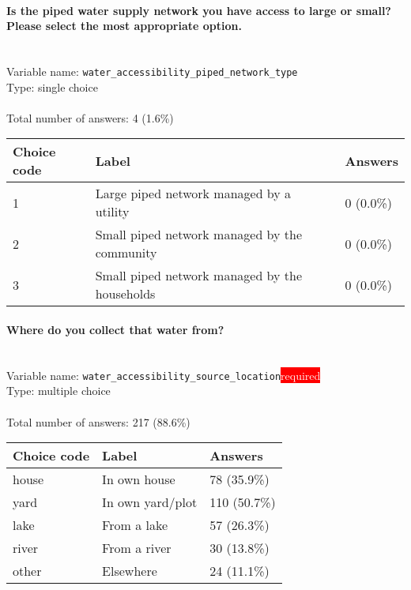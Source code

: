 \documentclass[11.5pt, a4paper]{scrartcl}
\begin{document}
\paragraph{Is the piped water supply network you have access to large or small? Please select the most appropriate option.}
\  \\Variable name: \texttt{water\_accessibility\_piped\_network\_type}\\
Type: single choice\\
\\Total number of answers: 4 (1.6\%)
\\[0.2em] \begin{tabular}{p{4cm}|p{8cm}|p{3cm}}
Choice code & Label & Answers \\
\hline
1 & Large piped network managed by a utility & \cellcolor{color0}0 (0.0\%)\\
\cellcolor{mygray} 2 & \cellcolor{mygray}Small piped network managed by the community  & \cellcolor{color0}0 (0.0\%)\\
3 & Small piped network managed by the households& \cellcolor{color0}0 (0.0\%)\\
\end{tabular}
\paragraph{Where do you collect that water from? }
\  \\Variable name: \texttt{water\_accessibility\_source\_location}\hfill\colorbox{red}{\small{\textcolor{white}{required}}}\\
 Type: multiple choice\\
\\Total number of answers: 217 (88.6\%)
\\[0.2em] \begin{tabular}{p{4cm}|p{8cm}|p{3cm}}
Choice code & Label & Answers \\
\hline
house & In own house& \cellcolor{color1}78 (35.9\%)\\
\cellcolor{mygray} yard & \cellcolor{mygray}In own yard/plot & \cellcolor{color2}110 (50.7\%)\\
lake & From a lake& \cellcolor{color1}57 (26.3\%)\\
\cellcolor{mygray} river & \cellcolor{mygray}From a river & \cellcolor{color0}30 (13.8\%)\\
other & Elsewhere& \cellcolor{color0}24 (11.1\%)\\
\end{tabular}
\end{document}
